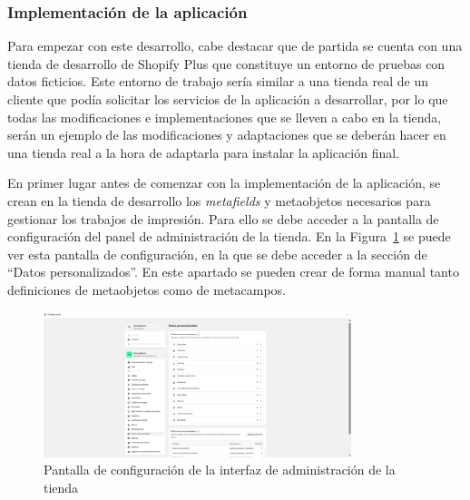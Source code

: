 \documentclass[12pt]{article}
\begin{document}
\subsubsection{Implementación de la aplicación}

Para empezar con este desarrollo, cabe destacar que de partida se cuenta con una tienda de desarrollo de Shopify Plus que constituye un entorno de pruebas con datos ficticios.
Este entorno de trabajo sería similar a una tienda real de un cliente que podía solicitar los servicios de la aplicación a desarrollar, por lo que todas las modificaciones e implementaciones
que se lleven a cabo en la tienda, serán un ejemplo de las modificaciones y adaptaciones que se deberán hacer en una tienda real a la hora de adaptarla para instalar la aplicación final.

En primer lugar antes de comenzar con la implementación de la aplicación, se crean en la tienda de desarrollo los \textit{metafields} y metaobjetos necesarios para gestionar
los trabajos de impresión. Para ello se debe acceder a la pantalla de configuración del panel de administración de la tienda. En la Figura~\ref{fig:configuracionMetafields} se puede ver
esta pantalla de configuración, en la que se debe acceder a la sección de ``Datos personalizados''. En este apartado se pueden crear de forma manual
tanto definiciones de metaobjetos como de metacampos.

\begin{figure}[ht]
    \centering
    \includegraphics[width=0.8\textwidth]{imagenesUS2/configuracionAdministradorTienda.png}
    \caption{\label{fig:configuracionMetafields}Pantalla de configuración de la interfaz de administración de la tienda}
    \vspace{\fill}
\end{figure}
\end{document}
